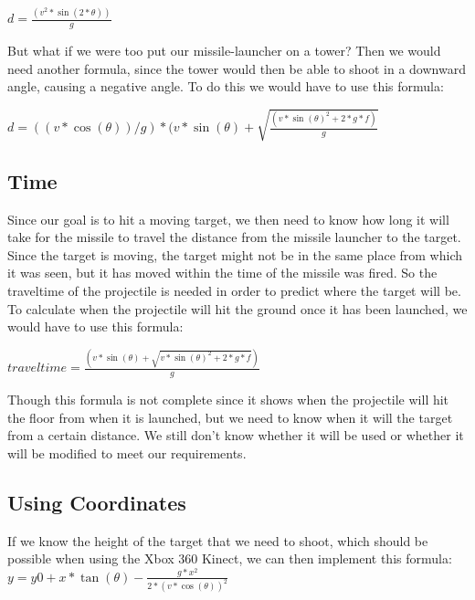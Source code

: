 \begin{math} d = \frac{(v^2*\sin(2*\theta))}{g}\end{math}

But what if we were too put our missile-launcher on a tower? Then we would need another formula, since the tower would then be able to shoot in a downward angle, causing a negative angle. To do this we would have to use this formula:

\begin{math}d = ((v*\cos(\theta))/g)*(v*\sin(\theta)+\sqrt{\frac{(v*\sin(\theta)^2+2*g*f)}{g}}\end{math}

\subsection*{Time}
Since our goal is to hit a moving target, we then need to know how long it will take for the missile to travel the distance from the missile launcher to the target. Since the target is moving, the target might not be in the same place from which it was seen, but it has moved within the time of the missile was fired. So the traveltime of the projectile is needed in order to predict where the target will be.
To calculate when the projectile will hit the ground once it has been launched, we would have to use this formula:

\begin{math}traveltime = \frac{(v*\sin(\theta)+\sqrt{v*\sin(\theta)^2+2*g*f})}{g}\end{math}

Though this formula is not complete  since it shows when the projectile will hit the floor from when it is launched, but we need to know when it will the target from a certain distance. We still don't know whether it will be used or whether it will be modified to meet our requirements.

\subsection*{Using Coordinates}
If we know the height of the target that we need to shoot, which should be possible when using the Xbox 360 Kinect, we can then implement this formula:
\begin{math}y=y0+x*\tan(\theta) - \frac{g*x^2}{2*(v*\cos(\theta))^2}\end{math}
 
